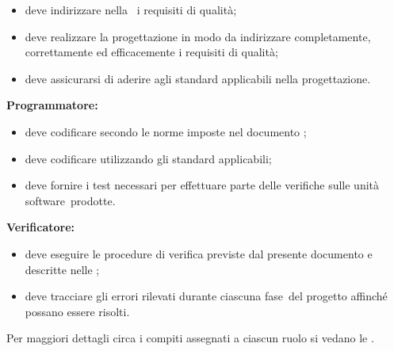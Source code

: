 \documentclass[../PianoDiQualifica.tex]{subfiles}
\begin{document}
			\begin{itemize}
				\item deve indirizzare nella \specificatecnica\ i requisiti di qualità;
				\item deve realizzare la progettazione in modo da indirizzare completamente, correttamente ed efficacemente i requisiti di qualità;
				\item deve assicurarsi di aderire agli standard applicabili nella progettazione.
			\end{itemize}
			\textbf{Programmatore:}
			\begin{itemize}
				\item deve codificare secondo le norme imposte nel documento \normediprogettov;
				\item deve codificare utilizzando gli standard applicabili;
				\item deve fornire i test necessari per effettuare parte delle verifiche sulle unità software\g\ prodotte.
			\end{itemize}
			\textbf{Verificatore:}
			\begin{itemize}
				\item deve eseguire le procedure di verifica previste dal presente documento e descritte nelle \normediprogettov;
				\item deve tracciare gli errori rilevati durante ciascuna fase\g\ del progetto affinché possano essere risolti.
			\end{itemize}
		Per maggiori dettagli circa i compiti assegnati a ciascun ruolo si vedano le \normediprogettov.
\end{document}
